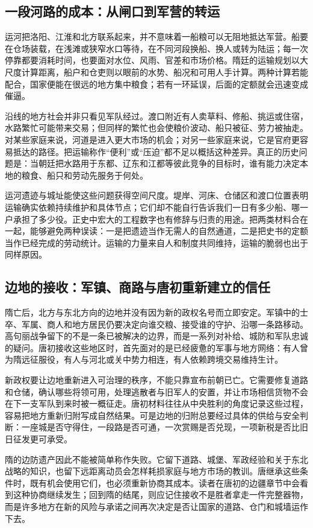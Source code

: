 \subsection{一段河路的成本：从闸口到军营的转运}
运河把洛阳、江淮和北方联系起来，并不意味着一船粮可以无阻地抵达军营。船要在仓场装载，在浅滩或狭窄水口等待，在不同河段换船、换人或转为陆运；每一次停靠都要消耗时间，也要面对水位、风雨、官差和市场价格。隋廷的运输规划以大尺度计算距离，船户和仓吏则以眼前的水势、船况和可用人手计算。两种计算若能配合，国家便能在很远的地方集中粮食；若有一环延误，后面的定额就会迅速变成催逼。

沿线的地方社会并非只看见军队经过。渡口附近有人卖草料、修船、挑运或住宿，水路繁忙可能带来交易；但同样的繁忙也会使粮价波动、船只被征、劳力被抽走。对某些家庭来说，河道是进入更大市场的机会；对另一些家庭来说，它是官府更容易抵达的路径。把运输称作“便利”或“压迫”都不足以概括这种差异。真正的历史问题是：当朝廷把水路用于东都、辽东和江都等彼此竞争的目标时，谁有能力决定本地的粮食、船只和劳动先服务于何处。

运河遗迹与城址能使这些问题获得空间尺度。堤岸、河床、仓储区和渡口位置表明运输确实依赖持续维护和具体节点；它们却不能自行告诉我们一日有多少船、哪一户承担了多少役。正史中宏大的工程数字也有修辞与归责的用途。把两类材料合在一起，能够避免两种误读：一是把遗迹当作无需人的自然通道，二是把史书的定额当作已经完成的劳动统计。运输的力量来自人和制度共同维持，运输的脆弱也出于同样原因。

\subsection{边地的接收：军镇、商路与唐初重新建立的信任}
隋亡后，北方与东北方向的边地并没有因为新的政权名号而立即安定。军镇中的士卒、军属、商人和地方居民仍要决定向谁交粮、接受谁的守护、沿哪一条路移动。高句丽战争留下的不是一条已被解决的边界，而是一系列对补给、城防和军队忠诚的疑问。唐初接收这些地区时，首先面对的是已经疲惫的军事与地方网络：有人曾为隋远征服役，有人与河北或关中势力相连，有人依赖跨境交易维持生计。

新政权要让边地重新进入可治理的秩序，不能只靠宣布前朝已亡。它需要修复道路和仓储，确认哪些将领可用，处理逃散者与旧军人的安置，并让市场相信货物不会在下一支军队到来时被一概征走。唐初材料往往从中央胜利的角度记录这些过程，容易把地方重新归附写成自然结果。可是边地的归附总要经过具体的供给与安全判断：一座城是否守得住，一段路是否可通，一次赏赐是否兑现，一项新税是否比旧日征发更可承受。

隋的边防遗产因此不能被简单称作失败。它留下道路、城堡、军政经验和关于东北战略的知识，也留下远距离动员会怎样耗损家庭与地方市场的教训。唐继承这些条件时，既有机会使用它们，也必须重新协商其成本。读者在唐初的边疆章节中会看到这种协商继续发生；回到隋的结尾，则应记住接收不是胜者拿走一件完整器物，而是许多地方在新的风险与承诺之间再次决定是否让国家的道路、仓门和城墙运作下去。

